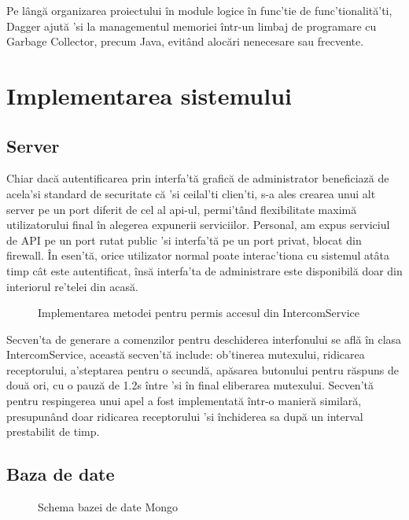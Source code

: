Pe lângă organizarea proiectului în module logice în func'tie de func'tionalită'ti, Dagger ajută 'si la managementul memoriei într-un limbaj de programare cu Garbage Collector, precum Java, evitând alocări nenecesare sau frecvente.


\section {Implementarea sistemului}

\subsection {Server}

Chiar dacă autentificarea prin interfa'tă grafică de administrator beneficiază de acela'si standard de securitate că 'si ceilal'ti clien'ti, s-a ales crearea unui alt server pe un port diferit de cel al \acrshort{api}-ul, permi'tând flexibilitate maximă utilizatorului final în alegerea expunerii serviciilor. Personal, am expus serviciul de API pe un port rutat public 'si interfa'tă pe un port privat, blocat din firewall. În esen'tă, orice utilizator normal poate interac'tiona cu sistemul atâta timp cât este autentificat, însă interfa'ta de administrare este disponibilă doar din interiorul re'telei din acasă.

\begin{figure}[h!]
  \centering
  \caption{Implementarea metodei pentru permis accesul din IntercomService}
\end{figure}

Secven'ta de generare a comenzilor pentru deschiderea interfonului se află în clasa IntercomService, această secven'tă include: ob'tinerea mutexului, ridicarea receptorului, a'steptarea pentru o secundă, apăsarea butonului pentru răspuns de două ori, cu o pauză de 1.2s între 'si în final eliberarea mutexului. Secven'tă pentru respingerea unui apel a fost implementată într-o manieră similară, presupunând doar ridicarea receptorului 'si închiderea sa după un interval prestabilit de timp.

\subsection {Baza de date}

\begin{figure}[h!]
  \centering
  \caption{Schema bazei de date Mongo}
\end{figure}

